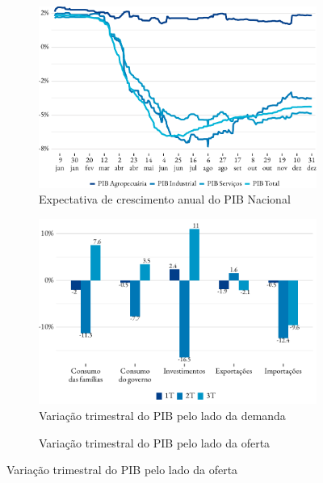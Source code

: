 \begin{figure}[!h]
	\begin{subfigure}{\linewidth}
		\caption{Expectativa de crescimento anual do PIB Nacional}
		\label{fig:expectativa_pib}
		\includegraphics{fig/pib_expec-1.pdf}
	\end{subfigure}
	\begin{subfigure}{\linewidth}
		\caption{Variação trimestral do PIB pelo lado da demanda}
		\label{fig:pib_demanda}
		\includegraphics{fig/pib_demanda.pdf}
		\notes{\trimestres[1-3]}
	\end{subfigure}
	\begin{subfigure}{\linewidth}
		\caption{Variação trimestral do PIB pelo lado da oferta}
		\label{fig:pib_oferta}

\end{subfigure}
\end{figure}
